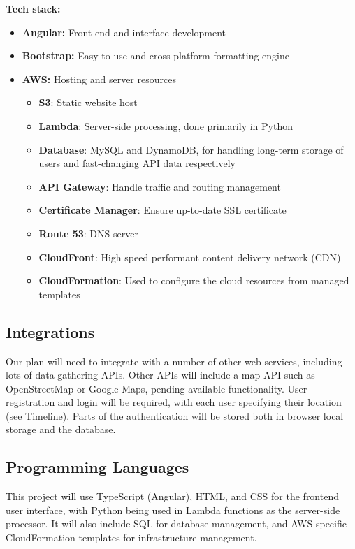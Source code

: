 \documentclass[12pt]{article}
\begin{document}
\textbf{Tech stack:}
\begin{itemize}
    \item \textbf{Angular:}  Front-end and interface development
    \item \textbf{Bootstrap:} Easy-to-use and cross platform formatting engine
    \item \textbf{AWS:} Hosting and server resources
          \begin{itemize}
              \item{\bf S3}: Static website host
              \item{\bf Lambda}: Server-side processing, done primarily in Python
              \item{\bf Database}: MySQL and DynamoDB, for handling long-term storage of users and fast-changing API data respectively
              \item{\bf API Gateway}: Handle traffic and routing management
              \item{\bf Certificate Manager}: Ensure up-to-date SSL certificate
              \item{\bf Route 53}: DNS server
              \item{\bf CloudFront}: High speed performant content delivery network (CDN)
              \item{\bf CloudFormation}: Used to configure the cloud resources from managed templates
          \end{itemize}
\end{itemize}

\subsection{Integrations}

Our plan will need to integrate with a number of other web services, including lots of data gathering APIs. Other APIs will include a map API such as OpenStreetMap or Google Maps, pending available functionality.
User registration and login will be required, with each user specifying their location (see Timeline). Parts of the authentication will be stored both in browser local storage and the database.

\subsection{Programming Languages}

This project will use TypeScript (Angular), HTML, and CSS for the frontend user interface, with Python being used in Lambda functions as the server-side processor. It will also include SQL for database management, and AWS specific CloudFormation templates for infrastructure management.
\end{document}
